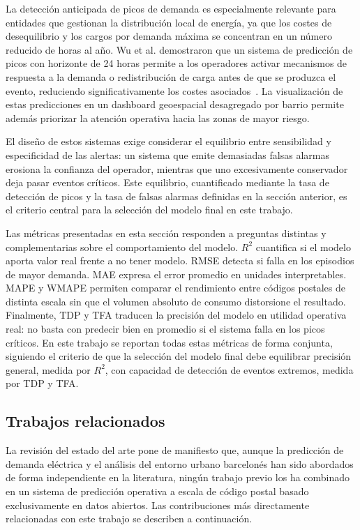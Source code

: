 \documentclass[12pt, a4paper]{article}
\begin{document}
La detección anticipada de picos de demanda es especialmente relevante para entidades que gestionan la distribución local de energía, ya que los costes de desequilibrio y los cargos por demanda máxima se concentran en un número reducido de horas al año. Wu et al. demostraron que un sistema de predicción de picos con horizonte de 24 horas permite a los operadores activar mecanismos de respuesta a la demanda o redistribución de carga antes de que se produzca el evento, reduciendo significativamente los costes asociados~\cite{wu2022}. La visualización de estas predicciones en un dashboard geoespacial desagregado por barrio permite además priorizar la atención operativa hacia las zonas de mayor riesgo.

El diseño de estos sistemas exige considerar el equilibrio entre sensibilidad y especificidad de las alertas: un sistema que emite demasiadas falsas alarmas erosiona la confianza del operador, mientras que uno excesivamente conservador deja pasar eventos críticos. Este equilibrio, cuantificado mediante la tasa de detección de picos y la tasa de falsas alarmas definidas en la sección anterior, es el criterio central para la selección del modelo final en este trabajo.

Las métricas presentadas en esta sección responden a preguntas distintas y complementarias sobre el comportamiento del modelo. $R^2$ cuantifica si el modelo aporta valor real frente a no tener modelo. RMSE detecta si falla en los episodios de mayor demanda. MAE expresa el error promedio en unidades interpretables. MAPE y WMAPE permiten comparar el rendimiento entre códigos postales de distinta escala sin que el volumen absoluto de consumo distorsione el resultado. Finalmente, TDP y TFA traducen la precisión del modelo en utilidad operativa real: no basta con predecir bien en promedio si el sistema falla en los picos críticos. En este trabajo se reportan todas estas métricas de forma conjunta, siguiendo el criterio de que la selección del modelo final debe equilibrar precisión general, medida por $R^2$, con capacidad de detección de eventos extremos, medida por TDP y TFA.

\subsection{Trabajos relacionados}

La revisión del estado del arte pone de manifiesto que, aunque la predicción de demanda eléctrica y el análisis del entorno urbano barcelonés han sido abordados de forma independiente en la literatura, ningún trabajo previo los ha combinado en un sistema de predicción operativa a escala de código postal basado exclusivamente en datos abiertos. Las contribuciones más directamente relacionadas con este trabajo se describen a continuación.
\end{document}
